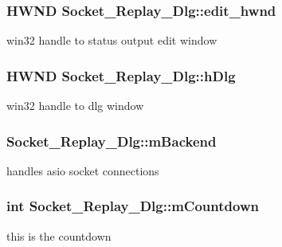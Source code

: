\subsubsection[{edit\+\_\+hwnd}]{\setlength{\rightskip}{0pt plus 5cm}H\+W\+N\+D Socket\+\_\+\+Replay\+\_\+\+Dlg\+::edit\+\_\+hwnd\hspace{0.3cm}{\ttfamily [protected]}}\label{class_socket___replay___dlg_a6f6192476df2dab219666f4bf716631e}
win32 handle to status output edit window \hypertarget{class_socket___replay___dlg_a00afcf609f06368bbe64cf31546736d0}{}
\subsubsection[{h\+Dlg}]{\setlength{\rightskip}{0pt plus 5cm}H\+W\+N\+D Socket\+\_\+\+Replay\+\_\+\+Dlg\+::h\+Dlg\hspace{0.3cm}{\ttfamily [protected]}}\label{class_socket___replay___dlg_a00afcf609f06368bbe64cf31546736d0}
win32 handle to dlg window \hypertarget{class_socket___replay___dlg_ad87d846ca29a78c8f1bda66c8dc1a48a}{}
\subsubsection[{m\+Backend}]{ Socket\+\_\+\+Replay\+\_\+\+Dlg\+::m\+Backend}\label{class_socket___replay___dlg_ad87d846ca29a78c8f1bda66c8dc1a48a}
handles asio socket connections \hypertarget{class_socket___replay___dlg_a14e128197a6d5df0e693de4d6bac4861}{}
\subsubsection[{m\+Countdown}]{\setlength{\rightskip}{0pt plus 5cm}int Socket\+\_\+\+Replay\+\_\+\+Dlg\+::m\+Countdown\hspace{0.3cm}{\ttfamily [protected]}}\label{class_socket___replay___dlg_a14e128197a6d5df0e693de4d6bac4861}
this is the countdown \hypertarget{class_socket___replay___dlg_ab9d98b70c4ae758d9c9e22c707873188}{}
